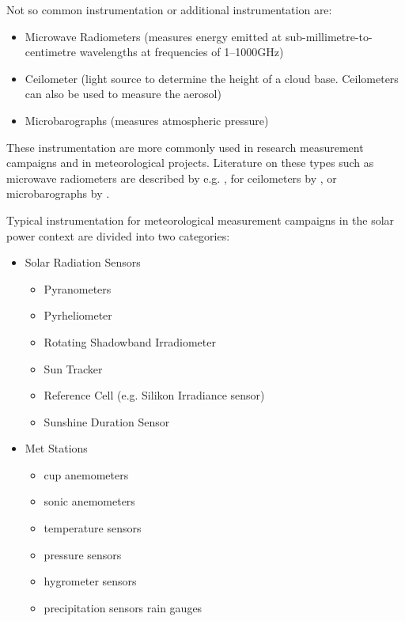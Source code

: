 Not so common instrumentation or additional instrumentation are:
\begin{itemize}
    \item Microwave Radiometers (measures energy emitted at sub-millimetre-to-centimetre wavelengths at frequencies of 1–1000GHz)  
    \item Ceilometer (light source to determine the height of a cloud base. Ceilometers can also be used to measure the aerosol)
    \item Microbarographs (measures atmospheric pressure)
\end{itemize}

These instrumentation are more commonly used in research measurement campaigns and in meteorological projects. Literature on these types such as microwave radiometers are described by e.g.  \cite{Ulaby1982,Matzler2006}, for ceilometers by \cite{Morris2016}, or microbarographs by \cite{Monserrat1992}.



Typical instrumentation for meteorological measurement campaigns in the solar power context are divided into two categories: 
\begin{itemize}
    \item Solar Radiation Sensors
        \begin{itemize}
            \item Pyranometers 
            \item Pyrheliometer
            \item Rotating Shadowband Irradiometer
            \item Sun Tracker
            \item Reference Cell (e.g. Silikon Irradiance sensor)
            \item Sunshine Duration Sensor
        \end{itemize}
    \item Met Stations
        \begin{itemize}
            \item cup anemometers
            \item sonic anemometers
             \item temperature sensors
             \item pressure sensors
             \item hygrometer sensors
             \item precipitation sensors rain gauges   
        \end{itemize}
\end{itemize}




